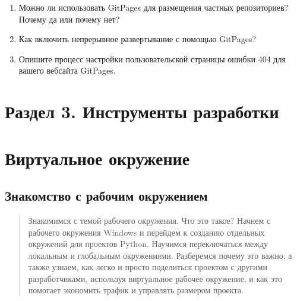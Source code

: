 \documentclass[letterpaper,10pt,russian]{sphinxmanual}
\begin{document}
\begin{enumerate}
\item {} 
\sphinxAtStartPar
Можно ли использовать GitPages для размещения частных репозиториев? Почему да или почему нет?

\item {} 
\sphinxAtStartPar
Как включить непрерывное развертывание с помощью GitPages?

\item {} 
\sphinxAtStartPar
Опишите процесс настройки пользовательской страницы ошибки 404 для вашего веб\sphinxhyphen{}сайта GitPages.

\end{enumerate}


\chapter{Раздел 3. Инструменты разработки}
\label{\detokenize{index:id11}}

\chapter{Виртуальное окружение}
\label{\detokenize{index:id12}}
\sphinxstepscope


\section{Знакомство с рабочим окружением}
\label{\detokenize{educational_materials/path_venv/content:id1}}\label{\detokenize{educational_materials/path_venv/content::doc}}
\sphinxAtStartPar
{}

\sphinxAtStartPar
{}
\begin{quote}

\sphinxAtStartPar
Знакомимся с темой рабочего окружения. Что это такое? Начнем с рабочего окружения Windows и перейдем к созданию отдельных окружений для проектов Python. Научимся переключаться между локальным и глобальным окружениями. Разберемся почему это важно, а также узнаем, как легко и просто поделиться проектом с другими разработчиками, используя виртуальное рабочее окружение, и как это помогает экономить трафик и управлять размером проекта.
\end{quote}
\end{document}
